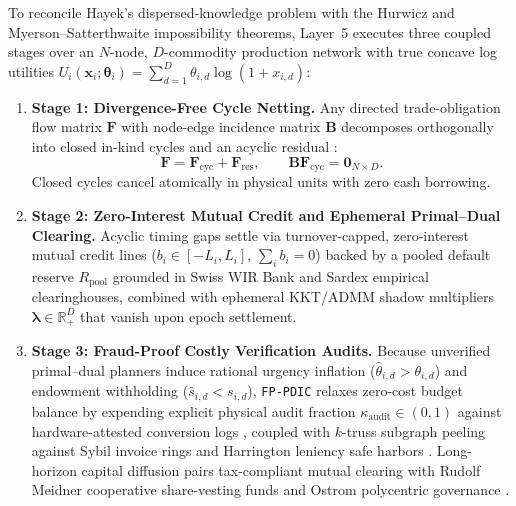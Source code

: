 \documentclass[11pt]{article}
\begin{document}
To reconcile Hayek's dispersed-knowledge problem \citep{hayek1945knowledge} with the Hurwicz \citep{hurwicz1972decentralized} and Myerson--Satterthwaite \citep{myerson1983efficient} impossibility theorems, Layer~5 executes three coupled stages over an $N$-node, $D$-commodity production network with true concave log utilities $U_i(\mathbf{x}_i; \boldsymbol{\theta}_i) = \sum_{d=1}^D \theta_{i,d}\log(1 + x_{i,d})$:
\begin{enumerate}
  \item \textbf{Stage 1: Divergence-Free Cycle Netting.} Any directed trade-obligation flow matrix $\mathbf{F}$ with node-edge incidence matrix $\mathbf{B}$ decomposes orthogonally into closed in-kind cycles and an acyclic residual \citep{fleischman2026cycles}:
  \begin{equation}
    \mathbf{F} = \mathbf{F}_{\mathrm{cyc}} + \mathbf{F}_{\mathrm{res}}, \qquad \mathbf{B}\mathbf{F}_{\mathrm{cyc}} = \mathbf{0}_{N \times D}.
    \label{eq:cycles}
  \end{equation}
  Closed cycles cancel atomically in physical units with zero cash borrowing.
  \item \textbf{Stage 2: Zero-Interest Mutual Credit and Ephemeral Primal--Dual Clearing.} Acyclic timing gaps settle via turnover-capped, zero-interest mutual credit lines ($b_i \in [-L_i, L_i]$, $\sum_i b_i = 0$) backed by a pooled default reserve $R_{\mathrm{pool}}$ grounded in Swiss WIR Bank \citep{stodder2009wir} and Sardex \citep{iosifidis2018sardex} empirical clearinghouses, combined with ephemeral KKT/ADMM shadow multipliers $\boldsymbol{\lambda} \in \mathbb{R}_+^D$ \citep{arrow1958stability} that vanish upon epoch settlement.
  \item \textbf{Stage 3: Fraud-Proof Costly Verification Audits.} Because unverified primal--dual planners induce rational urgency inflation ($\hat{\theta}_{i,d} > \theta_{i,d}$) and endowment withholding ($\hat{s}_{i,d} < s_{i,d}$), \texttt{FP-PDIC} relaxes zero-cost budget balance by expending explicit physical audit fraction $\kappa_{\mathrm{audit}} \in (0,1)$ against hardware-attested conversion logs \citep{perezrichet2022falsification, becker1968crime}, coupled with $k$-truss subgraph peeling against Sybil invoice rings and Harrington leniency safe harbors \citep{harrington2008leniency}. Long-horizon capital diffusion pairs tax-compliant mutual clearing with Rudolf Meidner cooperative share-vesting funds \citep{meidner1978funds} and Ostrom polycentric governance \citep{ostrom2010beyond}.
\end{enumerate}
\end{document}

